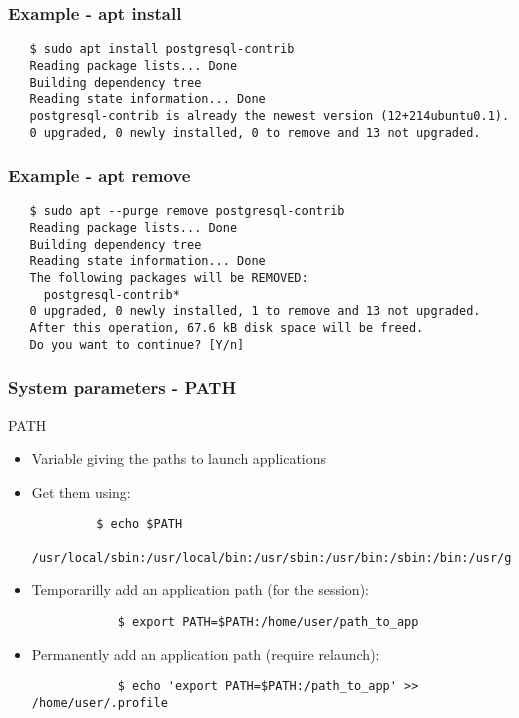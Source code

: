 \begin{frame}[fragile]
   \frametitle{Example - apt install}
   \begin{verbatim}
   $ sudo apt install postgresql-contrib
   Reading package lists... Done
   Building dependency tree
   Reading state information... Done
   postgresql-contrib is already the newest version (12+214ubuntu0.1).
   0 upgraded, 0 newly installed, 0 to remove and 13 not upgraded.
   \end{verbatim}
\end{frame}

\begin{frame}[fragile]
   \frametitle{Example - apt remove}
   \begin{verbatim}
   $ sudo apt --purge remove postgresql-contrib
   Reading package lists... Done
   Building dependency tree
   Reading state information... Done
   The following packages will be REMOVED:
     postgresql-contrib*
   0 upgraded, 0 newly installed, 1 to remove and 13 not upgraded.
   After this operation, 67.6 kB disk space will be freed.
   Do you want to continue? [Y/n]
   \end{verbatim}
\end{frame}

\begin{frame}[fragile]
   \frametitle{System parameters - PATH}
   PATH
   \begin{itemize}
      \item Variable giving the paths to launch applications
      \item Get them using:
      \begin{verbatim}
         $ echo $PATH
         /usr/local/sbin:/usr/local/bin:/usr/sbin:/usr/bin:/sbin:/bin:/usr/games:/usr/local/games:/snap/bin:
      \end{verbatim}
      \item Temporarilly add an application path (for the session):
      \begin{verbatim}
            $ export PATH=$PATH:/home/user/path_to_app
      \end{verbatim}
      \item Permanently add an application path (require relaunch):
      \begin{verbatim}
            $ echo 'export PATH=$PATH:/path_to_app' >> /home/user/.profile
      \end{verbatim}
   \end{itemize}
\end{frame}

